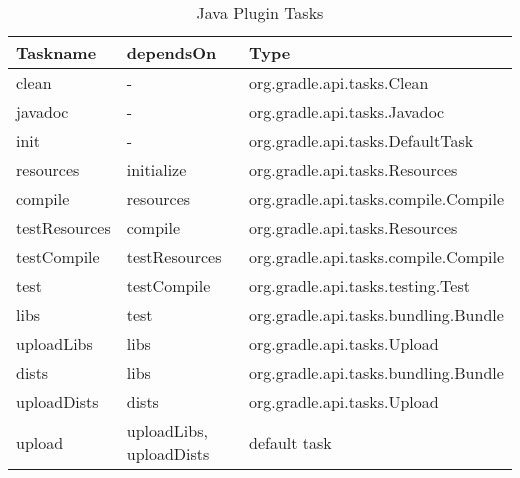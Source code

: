 \begin{table}
	\begin{center}
		\begin{tabular}{|l|l|l|} \hline
			\textbf{Taskname} & \textbf{dependsOn} & \textbf{Type} \\ \hline
			clean & - & org.gradle.api.tasks.Clean \\ \hline
			javadoc & - & org.gradle.api.tasks.Javadoc \\ \hline
			init & - & org.gradle.api.tasks.DefaultTask \\ \hline
			resources & initialize & org.gradle.api.tasks.Resources \\ \hline
			compile & resources & org.gradle.api.tasks.compile.Compile \\ \hline
			testResources & compile & org.gradle.api.tasks.Resources \\ \hline
			testCompile & testResources & org.gradle.api.tasks.compile.Compile \\ \hline
			test & testCompile & org.gradle.api.tasks.testing.Test \\ \hline
			libs & test & org.gradle.api.tasks.bundling.Bundle \\ \hline
			uploadLibs & libs & org.gradle.api.tasks.Upload \\ \hline
			dists & libs & org.gradle.api.tasks.bundling.Bundle \\ \hline
			uploadDists & dists & org.gradle.api.tasks.Upload \\ \hline
			upload & uploadLibs, uploadDists & default task \\ \hline
		\end{tabular}
	\end{center}
	\caption{Java Plugin Tasks}	
	\label{javatasks}
\end{table}

